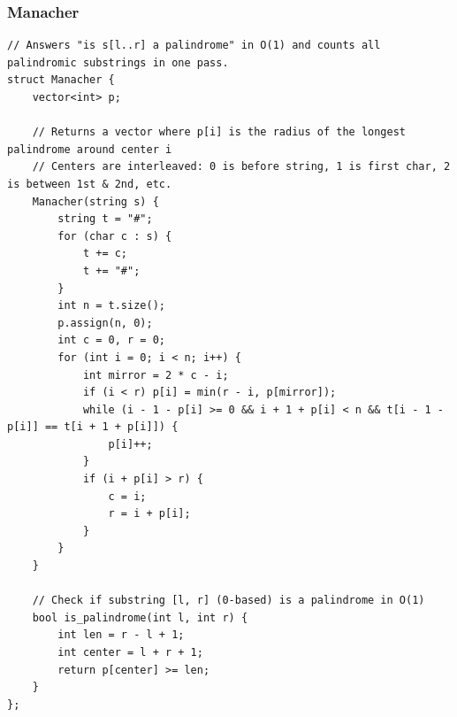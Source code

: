 \documentclass[9pt,a4paper,twocolumn]{extarticle}
\begin{document}
\subsubsection{Manacher}
\nopagebreak
\begin{lstlisting}
// Answers "is s[l..r] a palindrome" in O(1) and counts all palindromic substrings in one pass.
struct Manacher {
    vector<int> p;
    
    // Returns a vector where p[i] is the radius of the longest palindrome around center i
    // Centers are interleaved: 0 is before string, 1 is first char, 2 is between 1st & 2nd, etc.
    Manacher(string s) {
        string t = "#";
        for (char c : s) {
            t += c;
            t += "#";
        }
        int n = t.size();
        p.assign(n, 0);
        int c = 0, r = 0;
        for (int i = 0; i < n; i++) {
            int mirror = 2 * c - i;
            if (i < r) p[i] = min(r - i, p[mirror]);
            while (i - 1 - p[i] >= 0 && i + 1 + p[i] < n && t[i - 1 - p[i]] == t[i + 1 + p[i]]) {
                p[i]++;
            }
            if (i + p[i] > r) {
                c = i;
                r = i + p[i];
            }
        }
    }
    
    // Check if substring [l, r] (0-based) is a palindrome in O(1)
    bool is_palindrome(int l, int r) {
        int len = r - l + 1;
        int center = l + r + 1;
        return p[center] >= len;
    }
};
\end{lstlisting}

\filbreak
\end{document}
